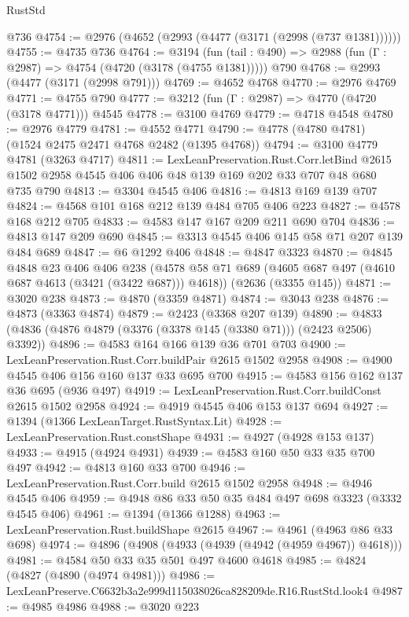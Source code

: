 \begin{lexlean}{RustStd}
\begin{coremodule}
    @736
@4754 := @2976 (@4652 (@2993 (@4477 (@3171 (@2998 (@737 @1381))))))
@4755 := @4735 @736
@4764 := @3194
    (fun (tail : @490) => @2988 (fun (Γ : @2987) => @4754 (@4720 (@3178 (@4755 @1381)))))
    @790
@4768 := @2993 (@4477 (@3171 (@2998 @791)))
@4769 := @4652 @4768
@4770 := @2976 @4769
@4771 := @4755 @790
@4777 := @3212 (fun (Γ : @2987) => @4770 (@4720 (@3178 @4771))) @4545
@4778 := @3100 @4769
@4779 := @4718 @4548
@4780 := @2976 @4779
@4781 := @4552 @4771
@4790 := @4778 (@4780 @4781) (@1524 @2475 @2471 @4768 @2482 (@1395 @4768))
@4794 := @3100 @4779 @4781 (@3263 @4717)
@4811 := LexLeanPreservation.Rust.Corr.letBind
    @2615
    @1502
    @2958
    @4545
    @406
    @406
    @48
    @139
    @169
    @202
    @33
    @707
    @48
    @680
    @735
    @790
@4813 := @3304 @4545 @406
@4816 := @4813 @169 @139 @707
@4824 := @4568 @101 @168 @212 @139 @484 @705 @406 @223
@4827 := @4578 @168 @212 @705
@4833 := @4583 @147 @167 @209 @211 @690 @704
@4836 := @4813 @147 @209 @690
@4845 := @3313 @4545 @406 @145 @58 @71 @207 @139 @484 @689
@4847 := @6 @1292 @406
@4848 := @4847 @3323
@4870 := @4845
    @4848
    @23
    @406
    @406
    @238
    (@4578 @58 @71 @689 (@4605 @687 @497 (@4610 @687 @4613 (@3421 (@3422 @687))) @4618))
    (@2636 (@3355 @145))
@4871 := @3020 @238
@4873 := @4870 (@3359 @4871)
@4874 := @3043 @238
@4876 := @4873 (@3363 @4874)
@4879 := @2423 (@3368 @207 @139)
@4890 := @4833 (@4836 (@4876 @4879 (@3376 (@3378 @145 (@3380 @71))) (@2423 @2506) @3392))
@4896 := @4583 @164 @166 @139 @36 @701 @703
@4900 := LexLeanPreservation.Rust.Corr.buildPair @2615 @1502 @2958
@4908 := @4900 @4545 @406 @156 @160 @137 @33 @695 @700
@4915 := @4583 @156 @162 @137 @36 @695 (@936 @497)
@4919 := LexLeanPreservation.Rust.Corr.buildConst @2615 @1502 @2958
@4924 := @4919 @4545 @406 @153 @137 @694
@4927 := @1394 (@1366 LexLeanTarget.RustSyntax.Lit)
@4928 := LexLeanPreservation.Rust.constShape
@4931 := @4927 (@4928 @153 @137)
@4933 := @4915 (@4924 @4931)
@4939 := @4583 @160 @50 @33 @35 @700 @497
@4942 := @4813 @160 @33 @700
@4946 := LexLeanPreservation.Rust.Corr.build @2615 @1502 @2958
@4948 := @4946 @4545 @406
@4959 := @4948 @86 @33 @50 @35 @484 @497 @698 @3323 (@3332 @4545 @406)
@4961 := @1394 (@1366 @1288)
@4963 := LexLeanPreservation.Rust.buildShape @2615
@4967 := @4961 (@4963 @86 @33 @698)
@4974 := @4896 (@4908 (@4933 (@4939 (@4942 (@4959 @4967)) @4618)))
@4981 := @4584 @50 @33 @35 @501 @497 @4600 @4618
@4985 := @4824 (@4827 (@4890 (@4974 @4981)))
@4986 := LexLeanPreserve.C6632b3a2e999d115038026ca828209de.R16.RustStd.look4
@4987 := @4985 @4986
@4988 := @3020 @223

\end{coremodule}
\end{lexlean}
